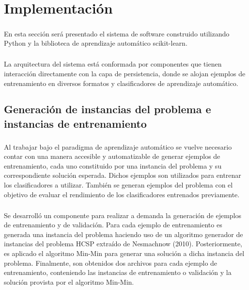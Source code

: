 \chapter{Implementación} \label{chapter-implementation}

\paragraph{} En esta sección será presentado el sistema de software construido utilizando Python y la biblioteca de aprendizaje automático scikit-learn.

\paragraph{} La arquitectura del sistema está conformada por componentes que tienen interacción directamente con la capa de persistencia, donde se alojan ejemplos de entrenamiento en diversos formatos y clasificadores de aprendizaje automático.

\section{Generación de instancias del problema e instancias de entrenamiento}

\paragraph{} Al trabajar bajo el paradigma de aprendizaje automático se vuelve necesario contar con una manera accesible y automatizable de generar ejemplos de entrenamiento, cada uno constituido por una instancia del problema y su correspondiente solución esperada. Dichos ejemplos son utilizados para entrenar los clasificadores a utilizar. También se generan ejemplos del problema con el objetivo de evaluar el rendimiento de los clasificadores entrenados previamente.

\paragraph{} Se desarrolló un componente para realizar a demanda la generación de ejemplos de entrenamiento y de validación. Para cada ejemplo de entrenamiento es generada una instancia del problema haciendo uso de un algoritmo generador de instancias del problema HCSP extraído de Nesmachnow (2010). Posteriormente, es aplicado el algoritmo Min-Min para generar una solución a dicha instancia del problema. Finalmente, son obtenidos dos archivos para cada ejemplo de entrenamiento, conteniendo las instancias de entrenamiento o validación y la solución provista por el algoritmo Min-Min.

